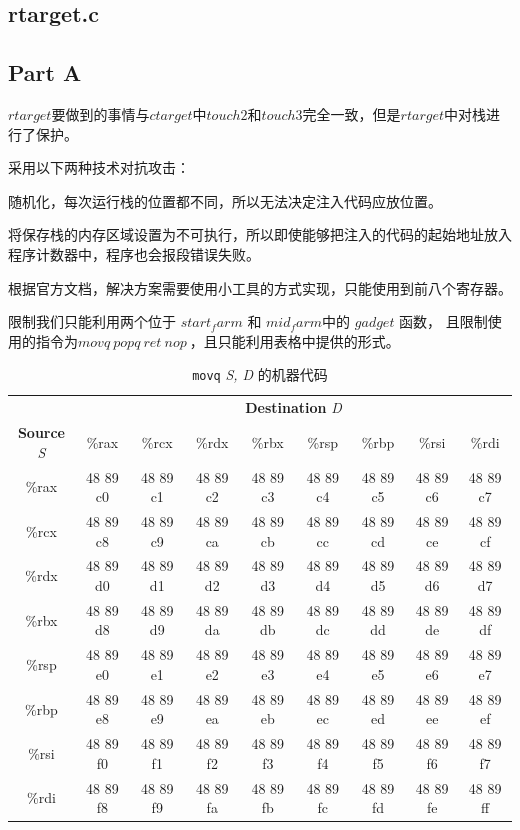 \subsection{rtarget.c}
\subsection{Part A}
$rtarget$要做到的事情与$ctarget$中$touch2$和$touch3$完全一致，但是$rtarget$中对栈进行了保护。

采用以下两种技术对抗攻击：

随机化，每次运行栈的位置都不同，所以无法决定注入代码应放位置。

将保存栈的内存区域设置为不可执行，所以即使能够把注入的代码的起始地址放入程序计数器中，程序也会报段错误失败。

根据官方文档，解决方案需要使用小工具的方式实现，只能使用到前八个寄存器。

限制我们只能利用两个位于 $start_farm$ 和 $mid_farm $中的 $gadget$ 函数，
且限制使用的指令为$ movq\ popq\ ret\ nop\ $，且只能利用表格中提供的形式。

\begin{table}[H]
    \centering
    \begin{tabular}{|c|c|c|c|c|c|c|c|c|}
        \hline
        & \multicolumn{8}{c|}{\textbf{Destination} \textit{D}} \\
        \cline{2-9}
        \textbf{Source} \textit{S} & \%rax    & \%rcx    & \%rdx    & \%rbx    & \%rsp    & \%rbp    & \%rsi    & \%rdi    \\
        \hline
        \%rax                      & 48 89 c0 & 48 89 c1 & 48 89 c2 & 48 89 c3 & 48 89 c4 & 48 89 c5 & 48 89 c6 & 48 89 c7 \\
        \%rcx                      & 48 89 c8 & 48 89 c9 & 48 89 ca & 48 89 cb & 48 89 cc & 48 89 cd & 48 89 ce & 48 89 cf \\
        \%rdx                      & 48 89 d0 & 48 89 d1 & 48 89 d2 & 48 89 d3 & 48 89 d4 & 48 89 d5 & 48 89 d6 & 48 89 d7 \\
        \%rbx                      & 48 89 d8 & 48 89 d9 & 48 89 da & 48 89 db & 48 89 dc & 48 89 dd & 48 89 de & 48 89 df \\
        \%rsp                      & 48 89 e0 & 48 89 e1 & 48 89 e2 & 48 89 e3 & 48 89 e4 & 48 89 e5 & 48 89 e6 & 48 89 e7 \\
        \%rbp                      & 48 89 e8 & 48 89 e9 & 48 89 ea & 48 89 eb & 48 89 ec & 48 89 ed & 48 89 ee & 48 89 ef \\
        \%rsi                      & 48 89 f0 & 48 89 f1 & 48 89 f2 & 48 89 f3 & 48 89 f4 & 48 89 f5 & 48 89 f6 & 48 89 f7 \\
        \%rdi                      & 48 89 f8 & 48 89 f9 & 48 89 fa & 48 89 fb & 48 89 fc & 48 89 fd & 48 89 fe & 48 89 ff \\
        \hline
    \end{tabular}
    \caption{\texttt{movq} \textit{S, D} 的机器代码}
    \label{tab:movq-reference}
\end{table}

